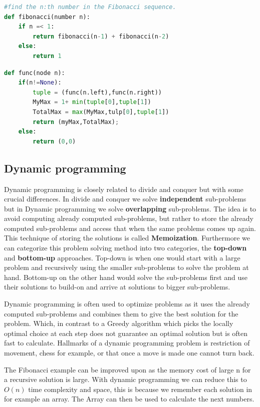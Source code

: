 \documentclass[12pt]{article} %
\begin{document}
\begin{lstlisting}[language=Python, caption=Fibbonaci in Python]
#find the n:th number in the Fibonacci sequence.
def fibonacci(number n):
    if n =< 1:
        return fibonacci(n-1) + fibonacci(n-2)
    else:
        return 1
\end{lstlisting}
\begin{lstlisting}[language=Python, caption=Perfect sub-tree in BST in Python]
def func(node n):
    if(n!=None):
        tuple = (func(n.left),func(n.right))
        MyMax = 1+ min(tuple[0],tuple[1])
        TotalMax = max(MyMax,tulp[0],tuple[1])
        return (myMax,TotalMax);
    else:
        return (0,0)
\end{lstlisting}

\subsection{Dynamic programming} %
Dynamic programming is closely related to divide and conquer but with some crucial differences. In divide and conquer we solve \textbf{independent} sub-problems but in Dynamic programming we solve \textbf{overlapping} sub-problems. The idea is to avoid computing already computed sub-problems, but rather to store the already computed sub-problems and access that when the same problems comes up again. This technique of storing the solutions is called \textbf{Memoization}. Furthermore we can categorize this problem solving method into two categories, the \textbf{top-down} and \textbf{bottom-up} approaches. Top-down is when one would start with a large problem and recursively using the smaller sub-problems to solve the problem at hand. Bottom-up on the other hand would solve the sub-problems first and use their solutions to build-on and arrive at solutions to bigger sub-problems.

\par Dynamic programming is often used to optimize problems as it uses the already computed sub-problems and combines them to give the best solution for the problem. Which, in contrast to a Greedy algorithm which picks the locally optimal choice at each step does not guarantee an optimal solution but is often fast to calculate. Hallmarks of a dynamic programming problem is restriction of movement, chess for example, or that once a move is made one cannot turn back.

\par The Fibonacci example can be improved upon as the memory cost of large n for a recursive solution is large. With dynamic programming we can reduce this to $O(n)$ time complexity and space, this is because we remember each solution in for example an array. The Array can then be used to calculate the next numbers.
\end{document}
